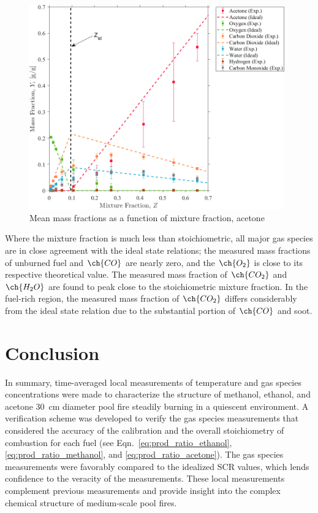 \documentclass[12pt]{article}
\begin{document}
\begin{figure}[!]
	\centering
\includegraphics[width=11.0cm,keepaspectratio]{Acetone_OVERALL_Mass_Frac_Mix_Frac.png}
	\caption[Mean mass fractions as a function of mixture fraction, acetone]{Mean mass fractions as a function of mixture fraction, acetone}
	\label{fig:Acetone_Mix_Frac}
\end{figure}

Where the mixture fraction is much less than stoichiometric, all major gas species are in close agreement with the ideal state relations; the measured mass fractions of unburned fuel and $\ch{CO}$ are nearly zero, and the $\ch{O_2}$ is close to its respective theoretical value. The measured mass fraction of $\ch{CO_{2}}$ and $\ch{H_{2}O}$ are found to peak close to the stoichiometric mixture fraction. In the fuel-rich region, the measured mass fraction of $\ch{CO_{2}}$ differs considerably from the ideal state relation due to the substantial portion of $\ch{CO}$ and soot.




\clearpage

\section{Conclusion}
\label{sec:Conclusion}
In summary, time-averaged local measurements of temperature and gas species concentrations were made to characterize the structure of methanol, ethanol, and acetone \SI{30}{cm} diameter pool fire steadily burning in a quiescent environment. A verification scheme was developed to verify the gas species measurements that considered  the accuracy of the calibration and the overall stoichiometry of combustion for each fuel (see Eqn.~\ref{eq:prod_ratio_ethanol}, \ref{eq:prod_ratio_methanol}, and \ref{eq:prod_ratio_acetone}). The gas species measurements were favorably compared to the idealized SCR values, which lends confidence to the veracity of the measurements. These local measurements complement previous measurements and provide insight into the complex chemical structure of medium-scale pool fires.
\end{document}

